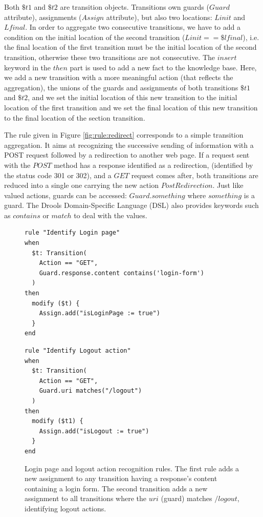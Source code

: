 \begin{itemize}
Both $\$t1$ and $\$t2$ are transition objects. Transitions own
guards ($Guard$ attribute), assignments ($Assign$ attribute), but
also two locations: $Linit$ and $Lfinal$. In order to aggregate
two consecutive transitions, we have to add a condition on the
initial location of the second transition ($Linit == \$lfinal$),
i.e. the final location of the first transition must be the
initial location of the second transition, otherwise these two
transitions are not consecutive. The $insert$ keyword in the
$then$ part is used to add a new fact to the knowledge base.
Here, we add a new transition with a more meaningful action (that
reflects the aggregation), the unions of the guards and
assignments of both transitions $\$t1$ and $\$t2$, and we set the
initial location of this new transition to the initial location
of the first transition and we set the final location of this new
transition to the final location of the section transition.

The rule given in Figure \ref{fig:rule:redirect} corresponds to a
simple transition aggregation. It aims at recognizing the
successive sending of information with a POST request followed by
a redirection to another web page.  If a request sent with the
$POST$ method has a response identified as a redirection,
(identified by the status code 301 or 302), and  a $GET$ request
comes after, both transitions are reduced into a single one
carrying the new action $PostRedirection$. Just like valued
actions, guards can be accessed: $Guard.something$ where
$something$ is a guard. The Drools Domain-Specific Language (DSL)
also provides keywords such as $contains$ or $match$ to deal with
the values.
\end{itemize}

\begin{figure}[h]
\begin{framed}
\begin{BVerbatim}
rule "Identify Login page"
when
  $t: Transition(
    Action == "GET",
    Guard.response.content contains('login-form')
  )
then
  modify ($t) {
    Assign.add("isLoginPage := true")
  }
end
\end{BVerbatim}
\end{framed}

\begin{framed}
\begin{BVerbatim}
rule "Identify Logout action"
when
  $t: Transition(
    Action == "GET",
    Guard.uri matches("/logout")
  )
then
  modify ($t1) {
    Assign.add("isLogout := true")
  }
end
\end{BVerbatim}
\end{framed}

    \caption{Login page and logout action recognition rules. The
    first rule adds a new assignment to any transition having a
    response's content containing a login form. The second
    transition adds a new assignment to all transitions where
    the $uri$ (guard) matches $/logout$, identifying logout
    actions.}
    \label{fig:rule:login}
\end{figure}

